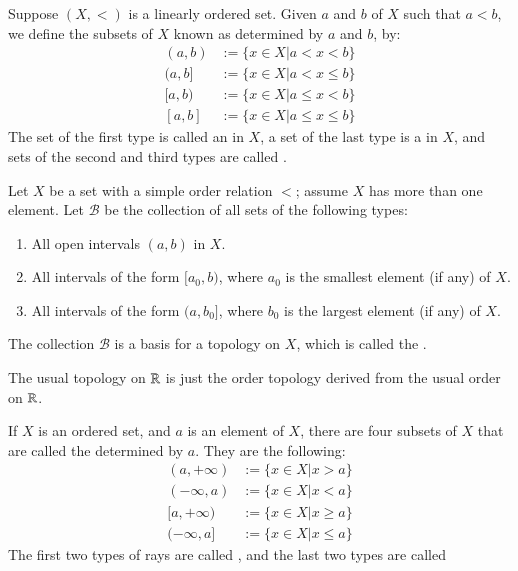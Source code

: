 \documentclass[12pt, a4paper, oneside, openright, titlepage]{book}
\begin{document}
\begin{definition}
    Suppose $(X,<)$ is a linearly ordered set. Given $a$ and $b$ of $X$ such that $a < b$, we define the subsets of $X$ known as  determined by $a$ and $b$, by: \begin{align*}
        (a,b) &:= \{x\in X\vert a < x < b\} \\
        (a,b] &:= \{x \in X\vert a < x \leq b\} \\
        [a,b) &:= \{x \in X\vert a\leq x < b\} \\
        [a,b] &:= \{x \in X\vert a \leq x \leq b\} 
    \end{align*}
    The set of the first type is called an  in $X$, a set of the last type is a  in $X$, and sets of the second and third types are called .
\end{definition}

\begin{definition}
    Let $X$ be a set with a simple order relation $<$; assume $X$ has more than one element. Let $\mathcal{B}$ be the collection of all sets of the following types: \begin{enumerate}
        \item All open intervals $(a,b)$ in $X$.
        \item All intervals of the form $[a_0,b)$, where $a_0$ is the smallest element (if any) of $X$.
        \item All intervals of the form $(a,b_0]$, where $b_0$ is the largest element (if any) of $X$.
    \end{enumerate}
    The collection $\mathcal{B}$ is a basis for a topology on $X$, which is called the .
\end{definition}

\begin{example}
    The usual topology on $\mathbb R$ is just the order topology derived from the usual order on $\mathbb R$.
\end{example}

\begin{definition}
    If $X$ is an ordered set, and $a$ is an element of $X$, there are four subsets of $X$ that are called the  determined by $a$. They are the following: \begin{align*}
        (a,+\infty) &:= \{x\in X\vert x > a\} \\
        (-\infty,a) &:= \{x \in X\vert x < a\} \\
        [a,+\infty) &:= \{x \in X\vert x\geq a\} \\
        (-\infty,a] &:= \{x \in X\vert x \leq a\} 
    \end{align*}
    The first two types of rays are called , and the last two types are called 
\end{definition}
\end{document}
